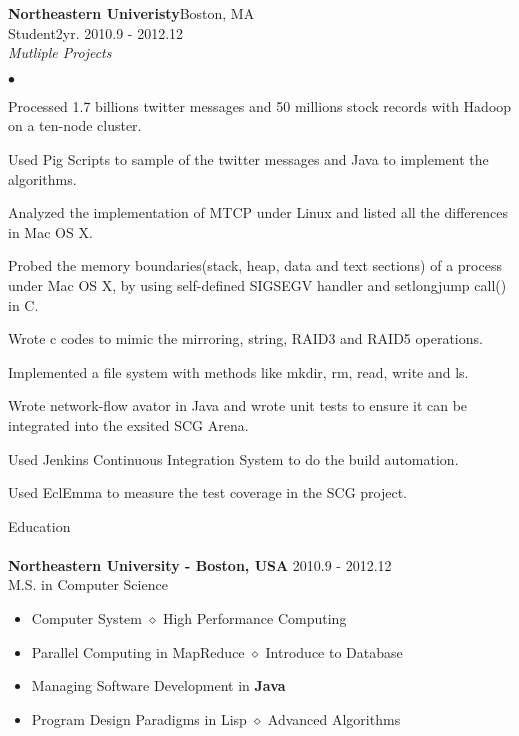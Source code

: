 \documentclass[10pt]{article}
\newcommand{\lineunder}{\vspace*{-8pt}\\\hspace*{-18pt}\hrulefill\\}
\newcommand{\header}[1]{{\hspace*{-15pt}\vspace*{6pt}\large{{#1}}}\vspace*{-6pt}\lineunder}
\newcommand{\company}[5]{
    \large{\textbf{#1}}\hfill \small{#3}\\
    #2\hfill \small{#4}\small{#5}\\
}
\newcommand{\project}[1]{\checkmark\normalsize{{\emph{#1}}}\\}
\newenvironment{achievements}
    {\begin{list}
        {$\bullet$}{\topsep 0pt \itemsep -1pt}} 
    {\end{list}}
\newcommand{\college}[5]{
    \textbf{#1 #2} \hfill #3 \\ #4 \\ #5
}
\begin{document}
\vspace*{5pt}
  \company{Northeastern Univeristy}{Student}{Boston, MA}{2yr. }{2010.9 - 2012.12}

  \project{Mutliple Projects}
  \begin{achievements}
\item Processed 1.7 billions twitter messages and 50 millions stock records with Hadoop on a ten-node cluster.
\item Used Pig Scripts to sample of the twitter messages and Java to implement the algorithms.
\item Analyzed the implementation of MTCP under Linux and listed all the differences in Mac OS X.
\item Probed the memory boundaries(stack, heap, data and text sections) of a process under Mac OS X, by using self-defined SIGSEGV handler and setlongjump call() in C.
\item Wrote c codes to mimic the mirroring, string, RAID3 and RAID5 operations.
\item Implemented a file system with methods like mkdir, rm, read, write and ls.
\item Wrote network-flow avator in Java and wrote unit tests to ensure it can be integrated into the exsited SCG Arena.
\item Used Jenkins Continuous Integration System to do the build automation.
\item Used EclEmma to measure the test coverage in the SCG project.
  \end{achievements}

\vspace*{10pt}


\header{Education}

\college{Northeastern University}{- Boston, USA} {2010.9 - 2012.12}
{M.S. in Computer Science}
{
\begin{itemize}
  \setlength{\itemsep}{0pt}
  \setlength{\parsep}{0pt}
  \setlength{\parskip}{0pt}
  \item {Computer System $\diamond$ High Performance Computing}
  \item {Parallel Computing in MapReduce $\diamond$ Introduce to Database}
  \item {Managing Software Development in \textbf{Java}}
  \item {Program Design Paradigms in Lisp $\diamond$ Advanced Algorithms}  
\end{itemize}
}
\end{document}
